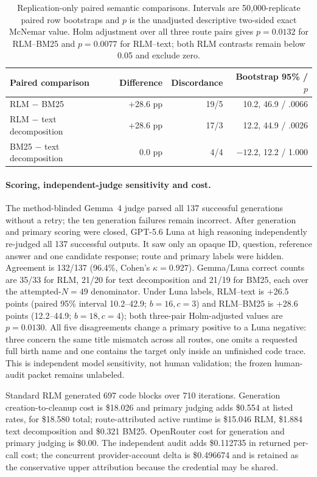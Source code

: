 \documentclass[letterpaper]{article}
\begin{document}
\begin{table}[!t]
\centering
\small
\setlength{\tabcolsep}{3pt}
\begin{tabular}{@{}p{5.8cm}rrr@{}}
\toprule
\textbf{Paired comparison} & \textbf{Difference} & \textbf{Discordance} & \textbf{Bootstrap 95\% / $p$} \\
\midrule
RLM $-$ BM25 & +28.6 pp & 19/5 & 10.2, 46.9 / .0066 \\
RLM $-$ text decomposition & +28.6 pp & 17/3 & 12.2, 44.9 / .0026 \\
BM25 $-$ text decomposition & 0.0 pp & 4/4 & $-12.2$, 12.2 / 1.000 \\
\bottomrule
\end{tabular}
\caption{Replication-only paired semantic comparisons. Intervals are 50,000-replicate paired row bootstraps and $p$ is the unadjusted descriptive two-sided exact McNemar value. Holm adjustment over all three route pairs gives $p=0.0132$ for RLM--BM25 and $p=0.0077$ for RLM--text; both RLM contrasts remain below 0.05 and exclude zero.}
\label{tab:supp-browsecomp-replication-paired}
\end{table}

\paragraph{Scoring, independent-judge sensitivity and cost.}
The method-blinded Gemma~4 judge parsed all 137 successful generations without a retry; the ten generation failures remain incorrect. After generation and primary scoring were closed, GPT-5.6 Luna at high reasoning independently re-judged all 137 successful outputs. It saw only an opaque ID, question, reference answer and one candidate response; route and primary labels were hidden. Agreement is 132/137 (96.4\%, Cohen's $\kappa{=}0.927$). Gemma/Luna correct counts are 35/33 for RLM, 21/20 for text decomposition and 21/19 for BM25, each over the attempted-$N{=}49$ denominator. Under Luna labels, RLM--text is +26.5 points (paired 95\% interval 10.2--42.9; $b{=}16,c{=}3$) and RLM--BM25 is +28.6 points (12.2--44.9; $b{=}18,c{=}4$); both three-pair Holm-adjusted values are $p{=}0.0130$. All five disagreements change a primary positive to a Luna negative: three concern the same title mismatch across all routes, one omits a requested full birth name and one contains the target only inside an unfinished code trace. This is independent model sensitivity, not human validation; the frozen human-audit packet remains unlabeled.

Standard RLM generated 697 code blocks over 710 iterations. Generation creation-to-cleanup cost is \$18.026 and primary judging adds \$0.554 at listed rates, for \$18.580 total; route-attributed active runtime is \$15.046 RLM, \$1.884 text decomposition and \$0.321 BM25. OpenRouter cost for generation and primary judging is \$0.00. The independent audit adds \$0.112735 in returned per-call cost; the concurrent provider-account delta is \$0.496674 and is retained as the conservative upper attribution because the credential may be shared.
\end{document}
